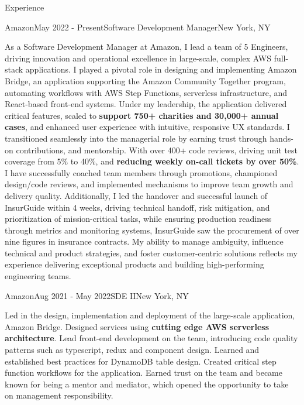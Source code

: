 \documentclass{resume} %
\begin{document}

\begin{rSection}{Experience}


\begin{rSubsection}{Amazon}{May 2022 - Present}{Software Development Manager}{New York, NY}

As a Software Development Manager at Amazon, I lead a team of 5 Engineers, driving innovation and operational excellence in large-scale, complex AWS full-stack applications. I played a pivotal role in designing and implementing Amazon Bridge, an application supporting the Amazon Community Together program, automating workflows with AWS Step Functions, serverless infrastructure, and React-based front-end systems. Under my leadership, the application delivered critical features, scaled to {\bf support 750+ charities and 30,000+ annual cases}, and enhanced user experience with intuitive, responsive UX standards. I transitioned seamlessly into the managerial role by earning trust through hands-on contributions, and mentorship. With over 400+ code reviews, driving unit test coverage from 5\% to 40\%, and {\bf reducing weekly on-call tickets by over 50\%}. I have successfully coached team members through promotions, championed design/code reviews, and implemented mechanisms to improve team growth and delivery quality. Additionally, I led the handover and successful launch of InsurGuide within 4 weeks, driving technical handoff, risk mitigation, and prioritization of mission-critical tasks, while ensuring production readiness through metrics and monitoring systems, InsurGuide saw the procurement of over nine figures in  insurance contracts. My ability to manage ambiguity, influence technical and product strategies, and foster customer-centric solutions reflects my experience delivering exceptional products and building high-performing engineering teams. 

\end{rSubsection}
\begin{rSubsection}{Amazon}{Aug 2021 - May 2022}{SDE II}{New York, NY}

Led in the design, implementation and deployment of the large-scale application, Amazon Bridge. 
Designed services using {\bf cutting edge AWS serverless architecture}. Lead front-end development on 
the team, introducing code quality patterns such as typescript, redux and component design. 
Learned and established best practices for DynamoDB table design. Created critical step 
function workflows for the application. Earned trust on the team and became known for being a 
mentor and mediator, which opened the opportunity to take on management responsibility.


\end{rSubsection}
\end{rSection}
\end{document}

